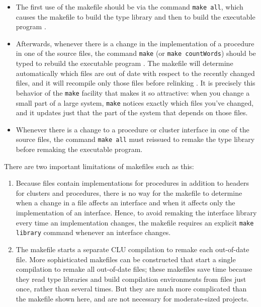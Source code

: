 \begin{itemize}
\item
The first use of the makefile should be via the command {\tt make all}, which
causes the makefile to build the type library  and then
to build the executable program .
\item
Afterwards, whenever there is a change in the implementation of a procedure in
one of the source  files, the command {\tt make} (or {\tt make
countWords}) should be typed to rebuild the executable program
.  The makefile will determine automatically which
 files are out of date with respect to the recently changed
 files, and it will recompile only those files before relinking
.  It is precisely this behavior of the {\tt make} facility
that makes it so attractive: when you change a small part of a large system,
{\tt make} notices exactly which files you've changed, and it updates just that
the part of the system that depends on those files.
\item
Whenever there is a change to a procedure or cluster interface in one of the
source  files, the command {\tt make all} must reissued to remake
the type library before remaking the executable program.
\end{itemize}

There are two important limitations of makefiles such as this:

\begin{enumerate}
\item
Because  files contain implementations for procedures in addition
to headers for clusters and procedures, there is no way for the makefile to
determine when a change in a  file affects an interface and when it
affects only the implementation of an interface.  Hence, to avoid remaking the
 interface library every time an implementation changes, the
makefile requires an explicit {\tt make library} command whenever an interface
changes.
\item
The makefile starts a separate CLU compilation to remake each out-of-date
 file.  More sophisticated makefiles can be constructed that start a
single compilation to remake all out-of-date  files; these makefiles
save time because they read  type libraries and build compilation
environments from  files just once, rather than several times.  But
they are much more complicated than the makefile shown here, and are not
necessary for moderate-sized projects.
\end{enumerate}

